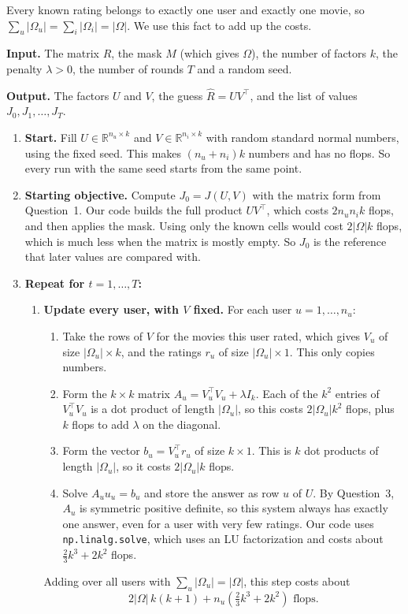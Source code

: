 Every known rating belongs to exactly one user and exactly one movie, so $\sum_u |\Omega_u| = \sum_i |\Omega_i| = |\Omega|$. We use this fact to add up the costs.

\textbf{Input.} The matrix $R$, the mask $M$ (which gives $\Omega$), the number of factors $k$, the penalty $\lambda > 0$, the number of rounds $T$ and a random seed.

\textbf{Output.} The factors $U$ and $V$, the guess $\hat R = UV^\top$, and the list of values $J_0, J_1, \dots, J_T$.

\begin{enumerate}
  \item \textbf{Start.} Fill $U \in \mathbb{R}^{n_u \times k}$ and $V \in \mathbb{R}^{n_i \times k}$ with random standard normal numbers, using the fixed seed. This makes $(n_u + n_i)k$ numbers and has no flops. So every run with the same seed starts from the same point.

  \item \textbf{Starting objective.} Compute $J_0 = J(U,V)$ with the matrix form from Question~1. Our code builds the full product $UV^\top$, which costs $2 n_u n_i k$ flops, and then applies the mask. Using only the known cells would cost $2|\Omega| k$ flops, which is much less when the matrix is mostly empty. So $J_0$ is the reference that later values are compared with.

  \item \textbf{Repeat for $t = 1, \dots, T$:}
  \begin{enumerate}
    \item \textbf{Update every user, with $V$ fixed.} For each user $u = 1, \dots, n_u$:
    \begin{enumerate}
      \item Take the rows of $V$ for the movies this user rated, which gives $V_u$ of size $|\Omega_u| \times k$, and the ratings $r_u$ of size $|\Omega_u| \times 1$. This only copies numbers.
      \item Form the $k \times k$ matrix $A_u = V_u^\top V_u + \lambda I_k$. Each of the $k^2$ entries of $V_u^\top V_u$ is a dot product of length $|\Omega_u|$, so this costs $2|\Omega_u|k^2$ flops, plus $k$ flops to add $\lambda$ on the diagonal.
      \item Form the vector $b_u = V_u^\top r_u$ of size $k \times 1$. This is $k$ dot products of length $|\Omega_u|$, so it costs $2|\Omega_u|k$ flops.
      \item Solve $A_u u_u = b_u$ and store the answer as row $u$ of $U$. By Question~3, $A_u$ is symmetric positive definite, so this system always has exactly one answer, even for a user with very few ratings. Our code uses \texttt{np.linalg.solve}, which uses an LU factorization and costs about $\tfrac{2}{3}k^3 + 2k^2$ flops.
    \end{enumerate}
    Adding over all users with $\sum_u |\Omega_u| = |\Omega|$, this step costs about
    \[
    2|\Omega|\,k(k+1) + n_u\left(\tfrac{2}{3}k^3 + 2k^2\right) \text{ flops.}
    \]


\end{enumerate}
\end{enumerate}
